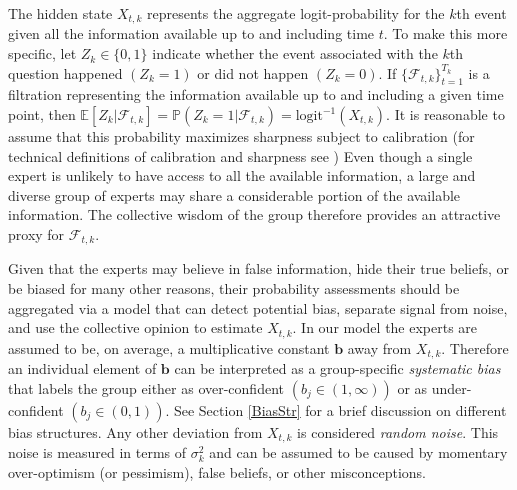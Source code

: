\documentclass[aoas, preprint]{imsart}
\numberwithin{equation}{section}
\theoremstyle{plain}
\newtheorem{mydef}{Definition}
\renewcommand{\P}{\mathbb{P}}
\newcommand{\E}{\mathbb{E}}
\newcommand{\logit}{\text{logit}}
\begin{document}
The hidden state $X_{t,k}$ represents the aggregate logit-probability for the $k$th event given all the information available up to and including time $t$. To make this more specific, let $Z_k \in \{0, 1\}$ indicate whether the event associated with the $k$th question happened $\left(Z_k = 1\right)$ or did not happen $\left(Z_k = 0\right)$. If $\{\mathcal{F}_{t,k}\}_{t=1}^{T_k}$ is a filtration representing the information available up to and including a given time point, then $\E[Z_k | \mathcal{F}_{t,k}] = \P(Z_k = 1| \mathcal{F}_{t,k}) = \logit^{-1}(X_{t,k})$. It is reasonable to assume that this probability 
maximizes sharpness subject to calibration (for technical definitions of calibration and sharpness see \cite{Ranjan08, gneiting2011combining})
Even though a single expert is unlikely to have access to all the available information, a large and diverse group of experts may share a considerable portion of the available information. The collective wisdom of the group therefore provides an attractive proxy for $\mathcal{F}_{t,k}$. 


Given that the experts may believe in false information, hide their true beliefs, or be biased for many other reasons, their probability assessments should be aggregated via a model that can detect potential bias, separate signal from noise, and use the collective opinion to estimate $X_{t,k}$. In our model the experts are assumed to be, on average, a multiplicative constant $\boldsymbol{b}$ away from $X_{t,k}$. Therefore an individual element of $\boldsymbol{b}$ can be interpreted as a group-specific \textit{systematic bias} that labels the group either as over-confident $\left( b_j \in (1, \infty)\right)$ or as under-confident $\left(b_j \in (0,1)\right)$.  See Section \ref{BiasStr} for a brief discussion on different bias structures. Any other deviation from $X_{t,k}$ is considered \textit{random noise}. This noise is measured in terms of $\sigma^2_k$ and can be assumed to be caused by momentary over-optimism (or pessimism), false beliefs, or other misconceptions. 
 
\end{document}
